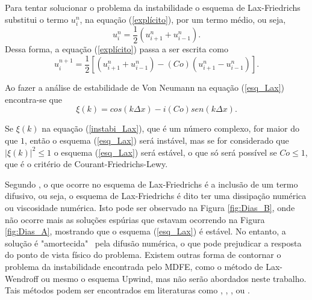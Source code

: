 Para tentar solucionar o problema da instabilidade o esquema de Lax-Friedrichs substitui o termo $u^{n}_{i}$, na equação (\ref{explícito}), por um termo médio, ou seja, 
\begin{equation} \label{ELF}
u^{n}_{i} = \frac{1}{2} \left( u^{n}_{i+1} + u^{n}_{i-1} \right).
\end{equation}
Dessa forma, a equação (\ref{explícito}) passa a ser escrita como
\begin{equation} \label{esq_Lax}
u^{n+1}_{i} =  \frac{1}{2} \left[ \left( u^{n}_{i+1} + u^{n}_{i-1} \right)  - (Co) \left( u^{n}_{i+1} - u^{n}_{i-1} \right) \right]. 
\end{equation} 

Ao fazer a análise de estabilidade de Von Neumann na equação (\ref{esq_Lax}) encontra-se que
\begin{equation} \label{instabi_Lax}
\xi (k) = cos(k \Delta x)-i(Co)sen(k \Delta x).
\end{equation}

Se $ \xi (k)$ na equação (\ref{instabi_Lax}), que é um número complexo, for maior do que $1$, então o esquema (\ref{esq_Lax}) será instável, mas se for considerado que $ | \xi (k)|^{2} \leq 1$ o esquema (\ref{esq_Lax}) será estável, o que só será possível se $Co \leq 1$, que é o critério de Courant-Friedrichs-Lewy.

Segundo , o que ocorre no esquema de Lax-Friedrichs é a inclusão de um termo difusivo, ou seja, o esquema de Lax-Friedrichs é dito ter uma dissipação numérica ou viscosidade numérica. Isto pode ser observado na Figura \ref{fig:Dias_B}, onde não ocorre mais as soluções espúrias que estavam ocorrendo na Figura \ref{fig:Dias_A}, mostrando que o esquema (\ref{esq_Lax}) é estável. No entanto, a solução é "amortecida" \ pela difusão numérica, o que pode prejudicar a resposta do ponto de vista físico do problema. Existem outras forma de contornar o problema da instabilidade encontrada pelo MDFE, como o método de Lax-Wendroff ou mesmo o esquema Upwind, mas não serão abordados neste trabalho. Tais métodos podem ser encontrados em literaturas como , , ,  ou .

